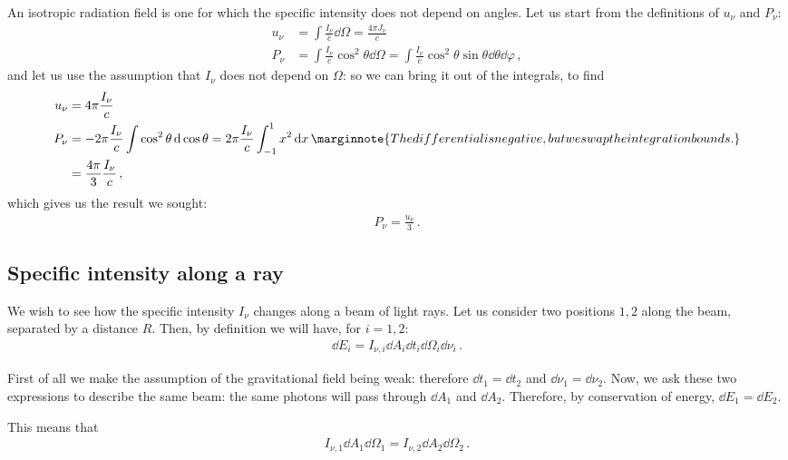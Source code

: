 \documentclass[main.tex]{subfiles}
\begin{document}
An isotropic radiation field is one for which the specific intensity does not depend on angles. 
Let us start from the definitions of \(u_{\nu }\) and \(P_{\nu }\): 
%
\begin{align}
u_{\nu } &= \int \frac{I_{\nu }}{c} \dd{\Omega } = \frac{4 \pi J_{\nu }}{c}  \\
P_{\nu } &= \int  \frac{I_{\nu }}{c}  \cos^2\theta \dd{\Omega } =
\int \frac{I_{\nu }}{c} \cos^2\theta \sin \theta \dd{\theta } \dd{\varphi }
\,,
\end{align}
%
and let us use the assumption that \(I_\nu \) does not depend on \(\Omega \): so we can bring it out of the integrals, to find 
%
\begin{align}
u_{\nu } &= 4 \pi  \frac{I_{\nu }}{c}  \\
P_{\nu } &= - 2 \pi  \frac{I_{\nu }}{c} \int \cos^2\theta \dd{\cos \theta } = 2 \pi \frac{I_{\nu }}{c} \int_{-1}^{1} x^2 \dd{x}  \marginnote{The differential is negative, but we swap the integration bounds.}\\
&= \frac{4 \pi }{3} \frac{I_{\nu }}{c}
\,,
\end{align}
%
which gives us the result we sought: 
%
\begin{align}
P_{\nu } = \frac{u_{\nu }}{3}
\,.
\end{align}

\subsection{Specific intensity along a ray}

We wish to see how the specific intensity \(I_{\nu }\) changes along a beam of light rays. Let us consider two positions \(1, 2\) along the beam, separated by a distance \(R\). Then, by definition we will have, for \(i =1, 2\):
%
\begin{align}
\dd{E_{i}} = I_{\nu, i} \dd{A_{i}} \dd{t_{i}} \dd{\Omega_{i}} \dd{\nu_{i}}
\,.
\end{align}

First of all we make the assumption of the gravitational field being weak: therefore \(\dd{t_{1}} = \dd{t_2 }\) and \(\dd{\nu_{1}} = \dd{\nu_2 }\). 
Now, we ask these two expressions to describe the same beam: the same photons will pass through \(\dd{A_1 }\) and  \(\dd{A_2 }\).  
Therefore, by conservation of energy, \(\dd{E_1 } = \dd{E_2 }\). 

This means that 
%
\begin{align}
I_{\nu, 1} \dd{A_1 } \dd{\Omega_1 } = 
I_{\nu, 2} \dd{A_2 } \dd{\Omega_2 }
\,.
\end{align}
%
\end{document}
